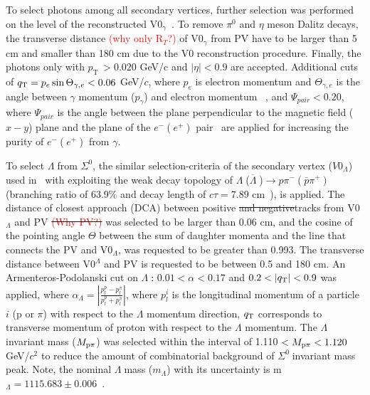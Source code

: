 \documentclass[ALICE,manyauthors]{cernphprep}
\newcommand{\sig}{\ensuremath{\Sigma^0  \; }}
\newcommand{\lam}{\ensuremath{\Lambda \; }}
\newcommand{\alam}{\ensuremath{\overline{\Lambda} \; }}
\newcommand{\pt}{\ensuremath{p_{\mathrm{T}\; }}}
\newcommand{\red}{\textcolor{red}}
\providecommand{\DIFaddtex}[1]{{\protect\color{blue}\uwave{#1}}} %
\providecommand{\DIFdeltex}[1]{{\protect\color{red}\sout{#1}}}                      %
\providecommand{\DIFaddbegin}{} %
\providecommand{\DIFaddend}{} %
\providecommand{\DIFdelbegin}{} %
\providecommand{\DIFdelend}{} %
\providecommand{\DIFadd}[1]{\texorpdfstring{\DIFaddtex{#1}}{#1}} %
\providecommand{\DIFdel}[1]{\texorpdfstring{\DIFdeltex{#1}}{}} %
\begin{document}
To select photons among all secondary vertices, further selection was performed on the level of the 
reconstructed  V0$_{\gamma}$~\cite{cite:ALICE-DirPhot2016,cite:pi0-2012}. 
To remove $\pi^0$ and $\eta$ meson Dalitz decays, the transverse distance \red{(why only R$_T$?)} 
of V0$_{\gamma}$ from PV have to be larger than 5 cm and smaller than 180 cm due to the V0 reconstruction 
procedure. Finally, the photons only with \pt $> 0.020$ GeV/c and $|\eta| <0.9$ are accepted.
Additional cuts of $q_{\rm{T}} = p_e \sin{\Theta_{\gamma,e}}<0.06$ GeV/$c$, where $p_e$ is electron momentum and
$\Theta_{\gamma,e}$ is the angle between  $\gamma$ momentum ($p_\gamma$) and electron momentum
~\cite{cite:ArPod}, and $\Psi_{pair} < 0.20$, where $\Psi_{pair}$ is the angle between the plane perpendicular to 
the magnetic field ($x-y$) plane and the plane of the $e^-(e^+)$ pair~\cite{cite:ALICE-pi0eta-2018}
are applied for increasing the purity of $e^-(e^+)$ from $\gamma$.

To select \lam from $\Sigma^0$, the similar selection-criteria of the secondary vertex (\DIFdelbegin \DIFdel{$V0_{\Lambda}$}\DIFdelend \DIFaddbegin \DIFadd{V0$_{\Lambda}$}\DIFaddend ) used 
in~\cite{cite:DDChin-Lam,cite:lambda_pp,cite:Lam-PLB14} with exploiting the weak decay topology
of \lam(\alam)$ \to p \pi^{-} (\bar{p} \pi^{+})$ (branching ratio of 63.9\% and decay length of
$c\tau = 7.89$ cm~\cite{cite:PDG}), is applied. The distance of closest approach (DCA) between 
positive \DIFdelbegin \DIFdel{and negative}\DIFdelend \DIFaddbegin \DIFadd{(negative) }\DIFaddend tracks from V0$_\Lambda$ and PV \DIFdelbegin \DIFdel{\red{(Why PV?)} }\DIFdelend was selected to be larger 
than 0.06 cm, and the cosine of the pointing angle $\Theta$ between the sum of daughter momenta and 
the line that connects the PV and V0$_\Lambda$, was requested to be greater than 0.993. The transverse 
distance between V0$^\Lambda$ and PV is requested to be between 0.5 and 180 cm. An 
Armenteros-Podolanski cut on \lam: $0.01 < \alpha < 0.17$ and $0.2 < |q_{\rm{T}}| < 0.9 $ 
was applied, where $\alpha_{\Lambda}  = |\frac{ p_l^{p} - p_l^{\pi}}{ p_l^{p} + p_l^{\pi} }  |$, where $p_l^i$ 
is the longitudinal momentum of a particle $i$ (p or $\pi$) 
with respect to the $\Lambda$ momentum direction, $q_{\rm{T}}$ corresponds to transverse momentum 
of proton with respect to the $\Lambda$ momentum. \DIFaddbegin \DIFadd{\red{Additionally a lifetime cut is applied as...}. 
}\DIFaddend The $\Lambda$ invariant mass ($M_{\rm{p}\pi}$) was selected 
within the interval of 1.110 $< M_{\rm{p}\pi}  < 1.120$ GeV/$c^2$ to reduce the amount of combinatorial 
background of \sig invariant mass peak. Note, the nominal \lam mass ($m_\Lambda$) with its uncertainty is m$_\Lambda=1115.683 \pm 0.006$~\cite{cite:PDG}.
\end{document}
